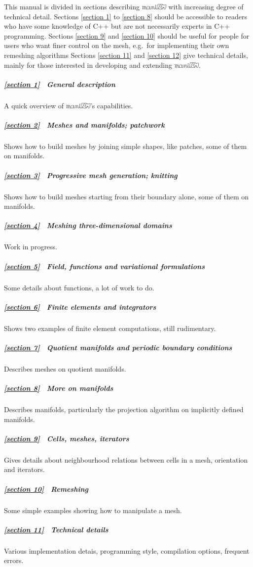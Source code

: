 \documentclass[a4paper]{scrreprt}
\def\numb{}
\newcommand\maniFEM{\leavevmode\hbox{\includegraphics[width=13mm]{manifem-small}}}
\newcommand\cinza[1]{\textcolor{coment}{#1}}
\renewcommand\tt{\normalfont\ttfamily}
\begin{document}
This manual is divided in sections describing {\maniFEM} with increasing degree of technical
detail.
Sections \ref{\numb section 1} to \ref{\numb section 8} should be accessible to readers
who have some knowledge of {\tt C++} but are not necessarily experts in {\tt C++} programming.
Sections \ref{\numb section 9} and \ref{\numb section 10} should be useful for people
for users who want finer control on the mesh,
e.g.\ for implementing their own remeshing algorithms
Sections \ref{\numb section 11} and \ref{\numb section 12} give technical details,
mainly for those interested in developing and extending \maniFEM.

\subparagraph*{\ref{\numb section 1} \ General description}
A quick overview of \maniFEM's capabilities.

\subparagraph*{\ref{\numb section 2} \ Meshes and manifolds; patchwork}
Shows how to build meshes by joining simple shapes, like patches, some of them on manifolds.

\subparagraph*{\ref{\numb section 3} \ Progressive mesh generation; knitting}
Shows how to build meshes starting from their boundary alone, some of them on manifolds.

\subparagraph*{\ref{\numb section 4} \ \cinza{Meshing three-dimensional domains}}
Work in progress.

\subparagraph*{\ref{\numb section 5} \ Field, functions and variational formulations}
Some details about functions, a lot of work to do.

\subparagraph*{\ref{\numb section 6} \ Finite elements and integrators}
Shows two examples of finite element computations, still rudimentary.

\subparagraph*{\ref{\numb section 7} \ Quotient manifolds and periodic boundary conditions}
Describes meshes on quotient manifolds.

\subparagraph*{\ref{\numb section 8} \ More on manifolds}
Describes manifolds, particularly the projection algorithm on implicitly defined manifolds.

\subparagraph*{\ref{\numb section 9} \ Cells, meshes, iterators}
Gives details about neighbourhood relations between cells in a mesh, orientation and iterators.

\subparagraph*{\ref{\numb section 10} \ Remeshing}
Some simple examples showing how to manipulate a mesh.

\subparagraph*{\ref{\numb section 11} \ Technical details}
Various implementation detais, programming style, compilation options, frequent errors.
\end{document}
